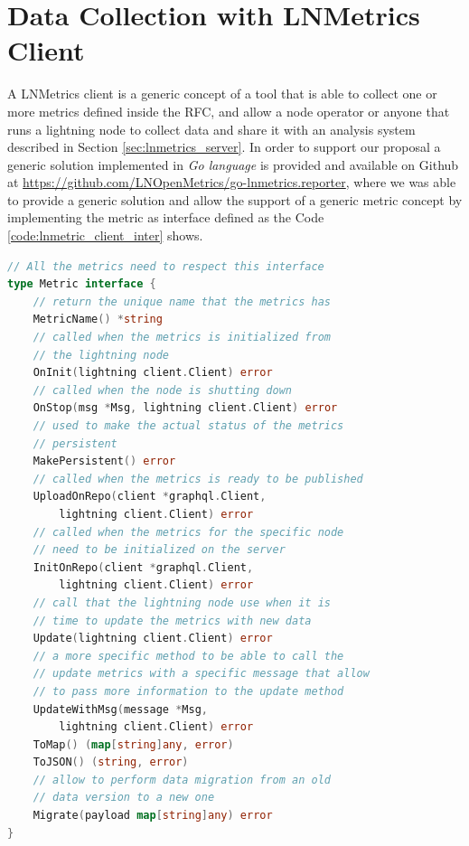 \section{Data Collection with LNMetrics Client}
\label{sec:lnmetrics_client}

A LNMetrics client is a generic concept of a tool that is able to collect one or more metrics 
defined inside the RFC, and allow a node operator or anyone that runs a lightning node
to collect data and share it with an analysis system described in Section \ref{sec:lnmetrics_server}.
In order to support our proposal a generic solution implemented in \emph{Go language} is provided 
and available on Github at \url{https://github.com/LNOpenMetrics/go-lnmetrics.reporter}, where we was able 
to provide a generic solution and allow the support of a generic metric concept 
by implementing the metric as interface defined as the Code \ref{code:lnmetric_client_inter} shows.

\begin{lstlisting}[language=go, basicstyle=\small,
                  caption={Metric interface provided in our client reference implementation.}, 
                  label={code:lnmetric_client_inter}]
// All the metrics need to respect this interface
type Metric interface {
    // return the unique name that the metrics has
    MetricName() *string
    // called when the metrics is initialized from 
    // the lightning node
    OnInit(lightning client.Client) error
    // called when the node is shutting down
    OnStop(msg *Msg, lightning client.Client) error
    // used to make the actual status of the metrics
    // persistent
    MakePersistent() error
    // called when the metrics is ready to be published
    UploadOnRepo(client *graphql.Client, 
        lightning client.Client) error
    // called when the metrics for the specific node 
    // need to be initialized on the server
    InitOnRepo(client *graphql.Client, 
        lightning client.Client) error
    // call that the lightning node use when it is 
    // time to update the metrics with new data
    Update(lightning client.Client) error
    // a more specific method to be able to call the 
    // update metrics with a specific message that allow 
    // to pass more information to the update method
    UpdateWithMsg(message *Msg, 
        lightning client.Client) error
    ToMap() (map[string]any, error)
    ToJSON() (string, error)
    // allow to perform data migration from an old 
    // data version to a new one
    Migrate(payload map[string]any) error
}
\end{lstlisting}

